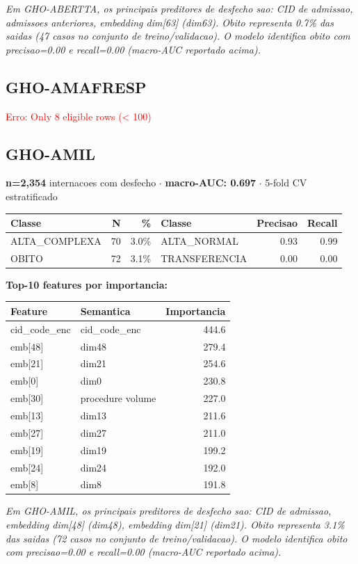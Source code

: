 \documentclass[11pt,a4paper]{article}
\begin{document}
\vspace{4pt}\noindent\textit{Em GHO-ABERTTA, os principais preditores de desfecho sao: CID de admissao, admissoes anteriores, embedding dim[63] (dim63). Obito representa 0.7\% das saidas (47 casos no conjunto de treino/validacao). O modelo identifica obito com precisao=0.00 e recall=0.00 (macro-AUC reportado acima).}

\subsection{GHO-AMAFRESP}
\textcolor{red}{Erro: Only 8 eligible rows (< 100)}

\subsection{GHO-AMIL}
\textbf{n=2,354} internacoes com desfecho $\cdot$ \textbf{macro-AUC: 0.697} $\cdot$ 5-fold CV estratificado

\begin{tabular}{lrr|lrr}
\toprule
Classe & N & \% & Classe & Precisao & Recall \\
\midrule
ALTA\_COMPLEXA & 70 & 3.0\% & ALTA\_NORMAL & 0.93 & 0.99 \\
OBITO & 72 & 3.1\% & TRANSFERENCIA & 0.00 & 0.00 \\
\bottomrule
\end{tabular}

\vspace{4pt}\noindent\textbf{Top-10 features por importancia:}

\begin{tabular}{llr}
\toprule
Feature & Semantica & Importancia \\
\midrule
cid\_code\_enc & cid\_code\_enc & 444.6 \\
emb[48] & dim48 & 279.4 \\
emb[21] & dim21 & 254.6 \\
emb[0] & dim0 & 230.8 \\
emb[30] & procedure volume & 227.0 \\
emb[13] & dim13 & 211.6 \\
emb[27] & dim27 & 211.0 \\
emb[19] & dim19 & 199.2 \\
emb[24] & dim24 & 192.0 \\
emb[8] & dim8 & 191.8 \\
\bottomrule
\end{tabular}

\vspace{4pt}\noindent\textit{Em GHO-AMIL, os principais preditores de desfecho sao: CID de admissao, embedding dim[48] (dim48), embedding dim[21] (dim21). Obito representa 3.1\% das saidas (72 casos no conjunto de treino/validacao). O modelo identifica obito com precisao=0.00 e recall=0.00 (macro-AUC reportado acima).}
\end{document}
